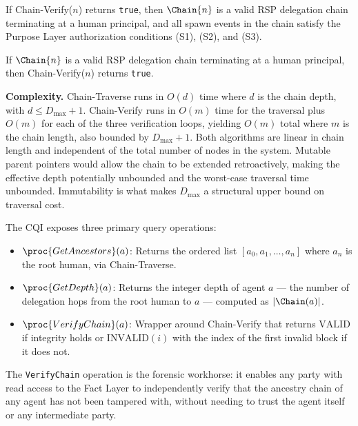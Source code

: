 \begin{prop}
\label{prop:chain_verify_soundness}
If Chain-Verify($n$) returns \texttt{true}, then $\Chain{n}$ is a valid RSP delegation chain terminating at a human principal, and all spawn events in the chain satisfy the Purpose Layer authorization conditions (S1), (S2), and (S3).
\end{prop}

\begin{prop}
\label{prop:chain_verify_completeness}
If $\Chain{n}$ is a valid RSP delegation chain terminating at a human principal, then Chain-Verify($n$) returns \texttt{true}.
\end{prop}

\textbf{Complexity.} Chain-Traverse runs in $O(d)$ time where $d$ is the chain depth, with $d \leq D_{\max} + 1$. Chain-Verify runs in $O(m)$ time for the traversal plus $O(m)$ for each of the three verification loops, yielding $O(m)$ total where $m$ is the chain length, also bounded by $D_{\max} + 1$. Both algorithms are linear in chain length and independent of the total number of nodes in the system. Mutable parent pointers would allow the chain to be extended retroactively, making the effective depth potentially unbounded and the worst-case traversal time unbounded. Immutability is what makes $D_{\max}$ a structural upper bound on traversal cost.

The CQI exposes three primary query operations:
\begin{itemize}
    \item $\proc{GetAncestors}(a)$: Returns the ordered list $[a_0, a_1, \ldots, a_n]$ where $a_n$ is the root human, via Chain-Traverse.

    \item $\proc{GetDepth}(a)$: Returns the integer depth of agent $a$ — the number of delegation hops from the root human to $a$ — computed as $|\Chain(a)|$.

    \item $\proc{VerifyChain}(a)$: Wrapper around Chain-Verify that returns $\mathrm{VALID}$ if integrity holds or $\mathrm{INVALID}$$(i)$ with the index of the first invalid block if it does not.
\end{itemize}

The \texttt{VerifyChain} operation is the forensic workhorse: it enables any party with read access to the Fact Layer to independently verify that the ancestry chain of any agent has not been tampered with, without needing to trust the agent itself or any intermediate party.

